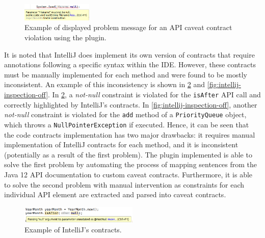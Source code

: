 \begin{figure}[h]
	\label{fig:plugin-problem}
	\centering
	\includegraphics[width=0.3\textwidth]{figs/plugin-problem.png}
	\caption{Example of displayed problem message for an API caveat contract violation using the plugin.}
\end{figure}

It is noted that IntelliJ does implement its own version of contracts that require annotations following a specific syntax within the IDE. However, these contracts must be manually implemented for each method and were found to be mostly inconsistent. An example of this inconsistency is shown in \ref{fig:intellij-inspection-on} and \ref{fig:intellij-inspection-off}. In \ref{fig:intellij-inspection-on}, a \textit{not-null} constraint is violated for the \lstinline{isAfter} API call and correctly highlighted by IntelliJ's contracts. In \ref{fig:intellij-inspection-off}, another \textit{not-null} constraint is violated for the \lstinline{add} method of a \lstinline{PriorityQueue} object, which throws a \lstinline{NullPointerException} if executed. Hence, it can be seen that the code contracts implementation has two major drawbacks: it requires manual implementation of IntelliJ contracts for each method, and it is inconsistent (potentially as a result of the first problem). The plugin implemented is able to solve the first problem by automating the process of mapping sentences from the Java 12 API documentation to custom caveat contracts. Furthermore, it is able to solve the second problem with manual intervention as constraints for each individual API element are extracted and parsed into caveat contracts.

\begin{figure}[h]
	\label{fig:intellij-inspection-on}
	\centering
	\includegraphics[width=0.5\textwidth]{figs/intellij-inspection-on.png}
	\caption{Example of IntelliJ's contracts.}
\end{figure}

